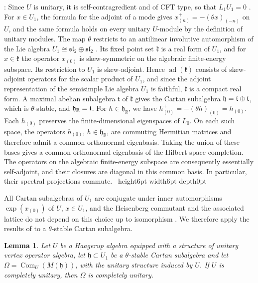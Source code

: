 \documentclass[leqno]{article}
\newcommand{\R}{\ensuremath{\mathbb{R}}}
\newcommand{\qed}{\hfill \vrule height6pt  width6pt depth0pt}
\let\i\relax %
\newcommand{\i}{\mathrm{i}}
\newtheorem{lemma}[thm]{Lemma}
\newenvironment{proof}[1][]{\noindent {\it Proof #1} : }{\hbox{~}\qed
\smallskip
}
\numberwithin{equation}{section}
\begin{document}
\begin{proof}
Since $U$ is unitary, it is self-contragredient and of CFT type, so that $L_1U_1 = 0$ \cite{Li94}. For $x \in U_1$, the formula \cite[(95) p.~43]{CKLW18} for the adjoint of a mode gives $x_{(n)}^+ = -(\theta x)_{(-n)}$ on $U$, and the same formula holds on every unitary $U$-module by the definition of unitary modules. The map $\theta$ restricts to an antilinear involutive automorphism of the Lie algebra $U_1 \cong \mathfrak{sl}_2 \oplus \mathfrak{sl}_2$ \cite[Theorem 8.5]{Arh26}. Its fixed point set $\mathfrak k$ is a real form of $U_1$, and for $x \in \mathfrak k$ the operator $x_{(0)}$ is skew-symmetric on the algebraic finite-energy subspace. Its restriction to $U_1$ is skew-adjoint. Hence $\operatorname{ad}(\mathfrak k)$ consists of skew-adjoint operators for the scalar product of $U_1$, and since the adjoint representation of the semisimple Lie algebra $U_1$ is faithful, $\mathfrak k$ is a compact real form. A maximal abelian subalgebra $\mathfrak t$ of $\mathfrak k$ gives the Cartan subalgebra $\mathfrak h = \mathfrak t \oplus \i\mathfrak t$, which is $\theta$-stable, and $\mathfrak h_{\R} = \i\mathfrak t$. For $h \in \mathfrak h_{\R}$, we have $h_{(0)}^+ = -(\theta h)_{(0)} = h_{(0)}$.
Each $h_{(0)}$ preserves the finite-dimensional eigenspaces of $L_0$. On each such space, the operators $h_{(0)}$, $h \in \mathfrak h_{\R}$, are commuting Hermitian matrices and therefore admit a common orthonormal eigenbasis. Taking the union of these bases gives a common orthonormal eigenbasis of the Hilbert space completion. The operators on the algebraic finite-energy subspace are consequently essentially self-adjoint, and their closures are diagonal in this common basis. In particular, their spectral projections commute.
\end{proof}

All Cartan subalgebras of $U_1$ are conjugate under inner automorphisms $\exp(x_{(0)})$ of $U$, $x \in U_1$, and the Heisenberg commutant and the associated lattice do not depend on this choice up to isomorphism \cite[Section 12]{Arh26}. We therefore apply the results of \cite[Section 12]{Arh26} to a $\theta$-stable Cartan subalgebra.

\begin{lemma}
\label{lem:heisenberg-descent}
Let $U$ be a Haagerup algebra equipped with a structure of unitary vertex operator algebra, let $\mathfrak h \subset U_1$ be a $\theta$-stable Cartan subalgebra and let $\Omega = \operatorname{Com}_U(M(\mathfrak h))$, with the unitary structure induced by $U$. If $U$ is completely unitary, then $\Omega$ is completely unitary.
\end{lemma}
\end{document}
